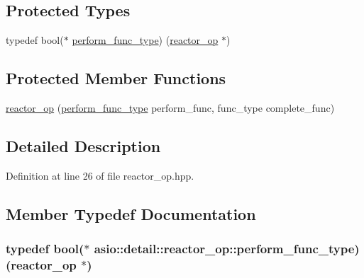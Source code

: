 \subsection*{Protected Types}
\begin{DoxyCompactItemize}
\item 
typedef bool($\ast$ \hyperlink{classasio_1_1detail_1_1reactor__op_aacee433534b12804a5905f9e441e57d3}{perform\+\_\+func\+\_\+type}) (\hyperlink{classasio_1_1detail_1_1reactor__op}{reactor\+\_\+op} $\ast$)
\end{DoxyCompactItemize}
\subsection*{Protected Member Functions}
\begin{DoxyCompactItemize}
\item 
\hyperlink{classasio_1_1detail_1_1reactor__op_afee07be367864462c5c330fb4a093997}{reactor\+\_\+op} (\hyperlink{classasio_1_1detail_1_1reactor__op_aacee433534b12804a5905f9e441e57d3}{perform\+\_\+func\+\_\+type} perform\+\_\+func, func\+\_\+type complete\+\_\+func)
\end{DoxyCompactItemize}


\subsection{Detailed Description}


Definition at line 26 of file reactor\+\_\+op.\+hpp.



\subsection{Member Typedef Documentation}
\hypertarget{classasio_1_1detail_1_1reactor__op_aacee433534b12804a5905f9e441e57d3}{}
\subsubsection[{perform\+\_\+func\+\_\+type}]{\setlength{\rightskip}{0pt plus 5cm}typedef bool($\ast$ asio\+::detail\+::reactor\+\_\+op\+::perform\+\_\+func\+\_\+type) ({\bf reactor\+\_\+op} $\ast$)\hspace{0.3cm}{\ttfamily [protected]}}\label{classasio_1_1detail_1_1reactor__op_aacee433534b12804a5905f9e441e57d3}


